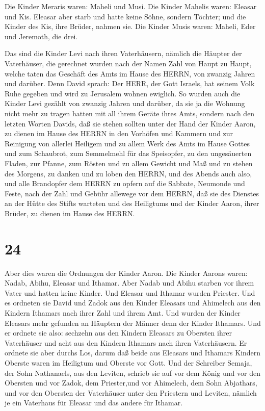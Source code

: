  Die Kinder Meraris waren: Maheli und Musi. Die Kinder
Mahelis waren: Eleasar und Kis.  Eleasar aber starb und
hatte keine Söhne, sondern Töchter; und die Kinder des Kis, ihre Brüder,
nahmen sie.  Die Kinder Musis waren: Maheli, Eder und
Jeremoth, die drei.

 Das sind die Kinder Levi nach ihren Vaterhäusern, nämlich
die Häupter der Vaterhäuser, die gerechnet wurden nach der Namen Zahl
von Haupt zu Haupt, welche taten das Geschäft des Amts im Hause des
HERRN, von zwanzig Jahren und darüber.  Denn David sprach:
Der HERR, der Gott Israels, hat seinem Volk Ruhe gegeben und wird zu
Jerusalem wohnen ewiglich.  So wurden auch die Kinder Levi
gezählt von zwanzig Jahren und darüber, da sie ja die Wohnung nicht mehr
zu tragen hatten mit all ihrem Geräte ihres Amts,  sondern
nach den letzten Worten Davids,  daß sie stehen sollten
unter der Hand der Kinder Aaron, zu dienen im Hause des HERRN in den
Vorhöfen und Kammern und zur Reinigung von allerlei Heiligem und zu
allem Werk des Amts im Hause Gottes  und zum Schaubrot, zum
Semmelmehl für das Speisopfer, zu den ungesäuerten Fladen, zur Pfanne,
zum Rösten und zu allem Gewicht und Maß  und zu stehen des
Morgens, zu danken und zu loben den HERRN, und des Abends auch also,
 und alle Brandopfer dem HERRN zu opfern auf die Sabbate,
Neumonde und Feste, nach der Zahl und Gebühr allewege vor dem HERRN,
 daß sie des Dienstes an der Hütte des Stifts warteten und
des Heiligtums und der Kinder Aaron, ihrer Brüder, zu dienen im Hause
des HERRN.

\hypertarget{section-23}{%
\section{24}\label{section-23}}

 Aber dies waren die Ordnungen der Kinder Aaron. Die Kinder
Aarons waren: Nadab, Abihu, Eleasar und Ithamar.  Aber Nadab
und Abihu starben vor ihrem Vater und hatten keine Kinder. Und Eleasar
und Ithamar wurden Priester.  Und es ordneten sie David und
Zadok aus den Kinder Eleasars und Ahimelech aus den Kindern Ithamars
nach ihrer Zahl und ihrem Amt.  Und wurden der Kinder
Eleasars mehr gefunden an Häuptern der Männer denn der Kinder Ithamars.
Und er ordnete sie also: sechzehn aus den Kindern Eleasars zu Obersten
ihrer Vaterhäuser und acht aus den Kindern Ithamars nach ihren
Vaterhäusern.  Er ordnete sie aber durchs Los, darum daß
beide aus Eleasars und Ithamars Kindern Oberste waren im Heiligtum und
Oberste vor Gott.  Und der Schreiber Semaja, der Sohn
Nathanaels, aus den Leviten, schrieb sie auf vor dem König und vor den
Obersten und vor Zadok, dem Priester,und vor Ahimelech, dem Sohn
Abjathars, und vor den Obersten der Vaterhäuser unter den Priestern und
Leviten, nämlich je ein Vaterhaus für Eleasar und das andere für
Ithamar.


